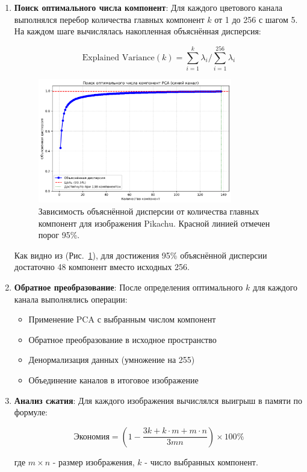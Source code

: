 \documentclass[14pt]{extarticle}
\begin{document}
\begin{enumerate}

\item \textbf{Поиск оптимального числа компонент}:
Для каждого цветового канала выполнялся перебор количества главных компонент $k$ от 1 до 256 с шагом 5. На каждом шаге вычислялась накопленная объяснённая дисперсия:

\begin{equation}
\text{Explained Variance}(k) = \sum_{i=1}^k \lambda_i \bigg/ \sum_{i=1}^{256} \lambda_i
\end{equation}

\begin{figure}[H]
\centering
\includegraphics[width=0.8\textwidth]{complexity.png}
\caption{Зависимость объяснённой дисперсии от количества главных компонент для изображения Pikachu. Красной линией отмечен порог 95\%.}
\label{fig:variance}
\end{figure}

Как видно из (Рис.~\ref{fig:variance}), для достижения 95\% объяснённой дисперсии достаточно 48 компонент вместо исходных 256.

\item \textbf{Обратное преобразование}:
После определения оптимального $k$ для каждого канала выполнялись операции:
\begin{itemize}
\item Применение PCA с выбранным числом компонент
\item Обратное преобразование в исходное пространство
\item Денормализация данных (умножение на 255)
\item Объединение каналов в итоговое изображение
\end{itemize}

\item \textbf{Анализ сжатия}:
Для каждого изображения вычислялся выигрыш в памяти по формуле:

\begin{equation}
\text{Экономия} = \left(1 - \frac{3k + k\cdot m + m\cdot n}{3mn}\right) \times 100\%
\end{equation}

где $m \times n$ - размер изображения, $k$ - число выбранных компонент.
\end{enumerate}
\end{document}
